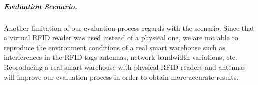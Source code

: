 \subparagraph{Evaluation Scenario.}
\label{subp:scenario_eval}
Another limitation of our evaluation process regards with the scenario. Since that a virtual \gls{RFID}
reader was used instead of a physical one, we are not able to reproduce the environment conditions
of a real smart warehouse such as interferences in the \gls{RFID} tags antennas, network bandwidth
variations, etc. Reproducing a real smart warehouse with physical \gls{RFID} readers and antennas
will improve our evaluation process in order to obtain more accurate results.
